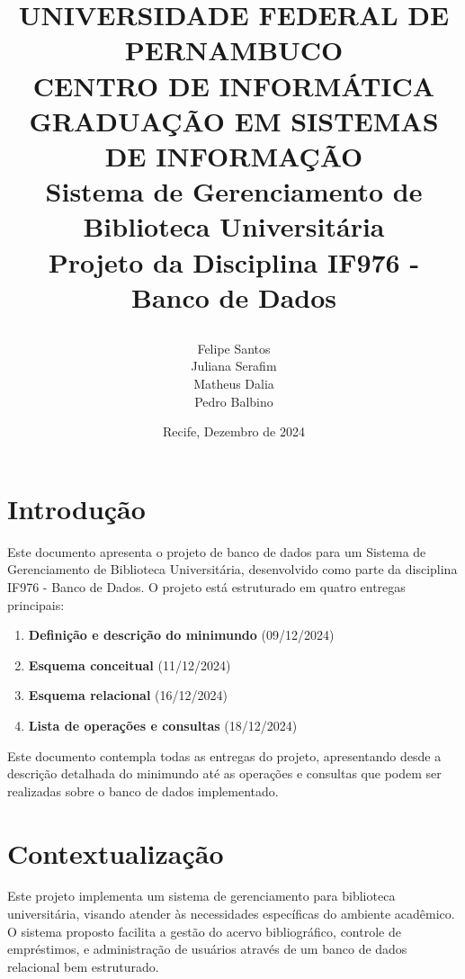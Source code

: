 \documentclass[12pt,a4paper]{article}
\title{
    \vspace{-1.5cm}
    \begin{center}
        \large{UNIVERSIDADE FEDERAL DE PERNAMBUCO}\\
        \large{CENTRO DE INFORMÁTICA}\\
        \large{GRADUAÇÃO EM SISTEMAS DE INFORMAÇÃO}\\[2cm]
        \huge{\textbf{Sistema de Gerenciamento de Biblioteca Universitária}}\\[0.5cm]
        \large{Projeto da Disciplina IF976 - Banco de Dados}\\[4cm]
    \end{center}
}
\author{
    \begin{tabular}{c}
        Felipe Santos\\
        Juliana Serafim\\
        Matheus Dalia\\
        Pedro Balbino
    \end{tabular}
}
\date{Recife, Dezembro de 2024}
\let\oldtableofcontents\tableofcontents
\renewcommand{\tableofcontents}{
  \begin{minipage}{\textwidth}
    \oldtableofcontents
  \end{minipage}
}
\begin{document}
\thispagestyle{empty}
\maketitle
\clearpage

\tableofcontents
\clearpage

\section{Introdução}
Este documento apresenta o projeto de banco de dados para um Sistema de Gerenciamento de Biblioteca Universitária, desenvolvido como parte da disciplina IF976 - Banco de Dados. O projeto está estruturado em quatro entregas principais:

\begin{enumerate}
    \item \textbf{Definição e descrição do minimundo} (09/12/2024)
    \item \textbf{Esquema conceitual} (11/12/2024)
    \item \textbf{Esquema relacional} (16/12/2024)
    \item \textbf{Lista de operações e consultas} (18/12/2024)
\end{enumerate}

Este documento contempla todas as entregas do projeto, apresentando desde a descrição detalhada do minimundo até as operações e consultas que podem ser realizadas sobre o banco de dados implementado.

\section{Contextualização}

\begin{conceptbox}
Este projeto implementa um sistema de gerenciamento para biblioteca universitária, visando atender às necessidades específicas do ambiente acadêmico. O sistema proposto facilita a gestão do acervo bibliográfico, controle de empréstimos, e administração de usuários através de um banco de dados relacional bem estruturado.
\end{conceptbox}
\end{document}
